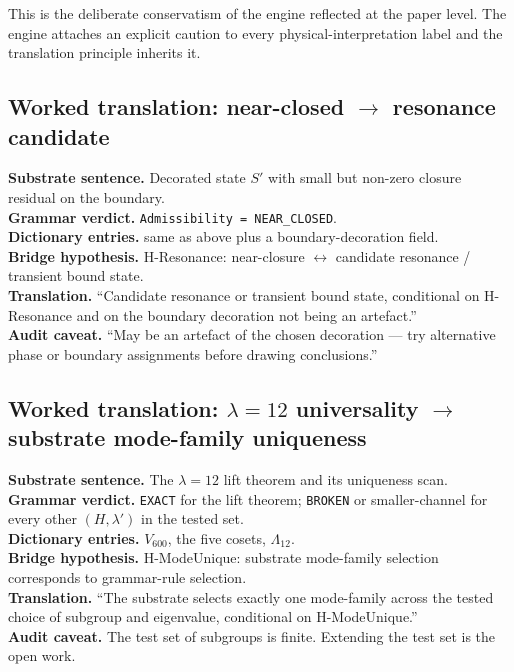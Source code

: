 \documentclass[11pt,a4paper]{article}
\newcommand{\Vsix}{V_{600}}
\newcommand{\Lambt}{\Lambda_{12}}
\begin{document}
This is the deliberate conservatism of the engine reflected at the
paper level. The engine attaches an explicit caution to every
physical-interpretation label and the translation principle
inherits it.

\subsection{Worked translation: near-closed $\to$ resonance
candidate}

\begin{transbox}
\textbf{Substrate sentence.} Decorated state $S'$ with small but
non-zero closure residual on the boundary.
\\
\textbf{Grammar verdict.} \texttt{Admissibility = NEAR\_CLOSED}.
\\
\textbf{Dictionary entries.} same as above plus a boundary-decoration
field.
\\
\textbf{Bridge hypothesis.} H-Resonance: near-closure
$\leftrightarrow$ candidate resonance / transient bound state.
\\
\textbf{Translation.} ``Candidate resonance or transient bound
state, conditional on H-Resonance and on the boundary decoration
not being an artefact.''
\\
\textbf{Audit caveat.} ``May be an artefact of the chosen
decoration --- try alternative phase or boundary assignments
before drawing conclusions.''
\end{transbox}

\subsection{Worked translation: $\lambda = 12$ universality $\to$
substrate mode-family uniqueness}

\begin{transbox}
\textbf{Substrate sentence.} The $\lambda = 12$ lift theorem and
its uniqueness scan.
\\
\textbf{Grammar verdict.} \texttt{EXACT} for the lift theorem;
\texttt{BROKEN} or smaller-channel for every other
$(H, \lambda')$ in the tested set.
\\
\textbf{Dictionary entries.} $\Vsix$, the five cosets, $\Lambt$.
\\
\textbf{Bridge hypothesis.} H-ModeUnique: substrate mode-family
selection corresponds to grammar-rule selection.
\\
\textbf{Translation.} ``The substrate selects exactly one
mode-family across the tested choice of subgroup and eigenvalue,
conditional on H-ModeUnique.''
\\
\textbf{Audit caveat.} The test set of subgroups is finite. Extending
the test set is the open work.
\end{transbox}
\end{document}

